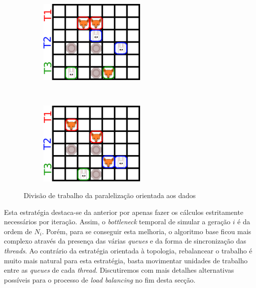 \documentclass[10pt,a4paper,oneside]{article}
\begin{document}
\begin{figure}[H]
    \centering
    \begin{subfigure}[b]{0.4\textwidth}
      \centering
      \includegraphics[height=1.6in]{grid1_par2.png}
    \end{subfigure}
    ~
    \begin{subfigure}[b]{0.4\textwidth}
      \centering
      \includegraphics[height=1.6in]{grid2_par2.png}
    \end{subfigure}
    \caption{Divisão de trabalho da paralelização orientada aos dados}
    \label{fig:par2}
\end{figure}

Esta estratégia destaca-se da anterior por apenas fazer os cálculos
estritamente necessários por iteração. Assim, o \textit{bottleneck}
temporal de simular a geração $i$ é da ordem de $N_i$. Porém, para se
conseguir esta melhoria, o algoritmo base ficou mais complexo através
da presença das várias \textit{queues} e da forma de sincronização das
\textit{threads}. Ao contrário da estratégia orientada à topologia,
rebalancear o trabalho é muito mais natural para esta estratégia,
basta movimentar unidades de trabalho entre as \textit{queues} de cada
\textit{thread}. Discutiremos com mais detalhes alternativas possíveis
para o processo de \textit{load balancing} no fim desta secção.
\end{document}
